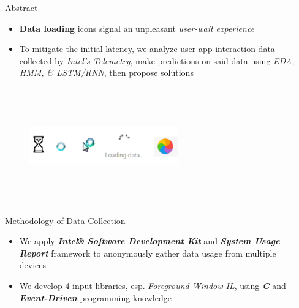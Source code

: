 \documentclass[final]{beamer}
\newlength{\sepwidth}
\newlength{\colwidth}
\newcommand{\separatorcolumn}{\begin{column}{\sepwidth}\end{column}}
\begin{document}
\begin{frame}[t]
  \begin{columns}[t]
    \separatorcolumn

    \begin{column}{\colwidth}

      \begin{block}{\huge{Abstract}}

        {
          \fontsize{37pt}{44.4pt} \selectfont 
          \begin{itemize}
            \item \textbf{Data loading} icons signal an unpleasant \textit{user-wait experience}
            \item To mitigate the initial latency, we analyze user-app interaction data collected by \textit{Intel's Telemetry},
            make predictions on said data using \textit{EDA, HMM, \& LSTM/RNN}, then propose solutions
        \end{itemize}
        }
        \begin{figure}\includegraphics[width=0.6\textwidth, height=5cm]{user-wait.jpeg}\end{figure}

      \end{block}

      \begin{alertblock}{\huge{Methodology of Data Collection}}

        {
          \fontsize{37pt}{44.4pt} \selectfont 
          \begin{itemize}
            \item We apply \textbf{\textit{Intel® Software Development Kit}} and \textbf{\textit{System Usage Report}} framework to anonymously gather data usage from multiple devices
            \item We develop 4 input libraries, esp. \textit{Foreground Window IL}, using \textbf{\textit{C}} and \textbf{\textit{Event-Driven}} programming knowledge
          \end{itemize}
        }
        

\end{alertblock}
\end{column}
\end{columns}
\end{frame}
\end{document}
